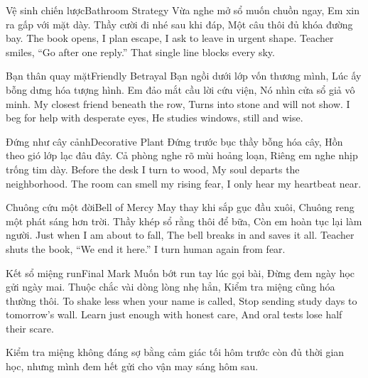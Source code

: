 \begin{tutuyetbox}{Vệ sinh chiến lược}{Bathroom Strategy}
Vừa nghe mở sổ muốn chuồn ngay,
Em xin ra gấp với mặt dày.
Thầy cười đi nhé sau khi đáp,
Một câu thôi đủ khóa đường bay.
\tcblower
The book opens, I plan escape,
I ask to leave in urgent shape.
Teacher smiles, “Go after one reply.”
That single line blocks every sky.
\end{tutuyetbox}

\begin{tutuyetbox}{Bạn thân quay mặt}{Friendly Betrayal}
Bạn ngồi dưới lớp vốn thương mình,
Lúc ấy bỗng dưng hóa tượng hình.
Em đảo mắt cầu lời cứu viện,
Nó nhìn cửa sổ giả vô minh.
\tcblower
My closest friend beneath the row,
Turns into stone and will not show.
I beg for help with desperate eyes,
He studies windows, still and wise.
\end{tutuyetbox}

\begin{tutuyetbox}{Đứng như cây cảnh}{Decorative Plant}
Đứng trước bục thầy bỗng hóa cây,
Hồn theo gió lớp lạc đâu đây.
Cả phòng nghe rõ mùi hoảng loạn,
Riêng em nghe nhịp trống tim dày.
\tcblower
Before the desk I turn to wood,
My soul departs the neighborhood.
The room can smell my rising fear,
I only hear my heartbeat near.
\end{tutuyetbox}

\begin{tutuyetbox}{Chuông cứu một đời}{Bell of Mercy}
May thay khi sắp gục đầu xuôi,
Chuông reng một phát sáng hơn trời.
Thầy khép sổ rằng thôi để bữa,
Còn em hoàn tục lại làm người.
\tcblower
Just when I am about to fall,
The bell breaks in and saves it all.
Teacher shuts the book, “We end it here.”
I turn human again from fear.
\end{tutuyetbox}

\begin{tutuyetbox}{Kết sổ miệng run}{Final Mark}
Muốn bớt run tay lúc gọi bài,
Đừng đem ngày học gửi ngày mai.
Thuộc chắc vài dòng lòng nhẹ hẳn,
Kiểm tra miệng cũng hóa thường thôi.
\tcblower
To shake less when your name is called,
Stop sending study days to tomorrow's wall.
Learn just enough with honest care,
And oral tests lose half their scare.
\end{tutuyetbox}

\begin{ghichu}
Kiểm tra miệng không đáng sợ bằng cảm giác tối hôm trước còn đủ thời gian học, nhưng mình đem hết gửi cho vận may sáng hôm sau.
\end{ghichu}